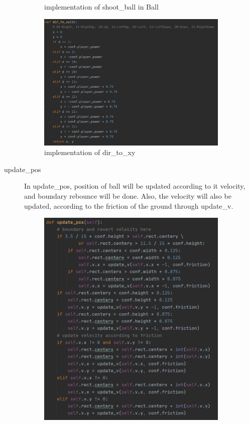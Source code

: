 \documentclass[14pt]{extarticle}
\begin{document}
\begin{description}
\begin{figure}[H]
\begin{center}
			\caption{implementation of shoot\_ball in Ball}
		\end{center}
	\end{figure}
	\begin{figure}
		\begin{center}
			\includegraphics[width=0.9\textwidth]{dir_to_xy}
			\caption{implementation of dir\_to\_xy}
		\end{center}
	\end{figure}
	\item[update\_pos]
	In update\_pos, position of ball will be updated according to it velocity, and boundary rebounce will be done. Also, the velocity will also be updated, according to the friction of the ground through update\_v.
	\begin{figure}[H]
		\begin{center}
			\includegraphics[width=0.9\textwidth]{Ball_update_pos}

\end{center}
\end{figure}
\end{description}
\end{document}
